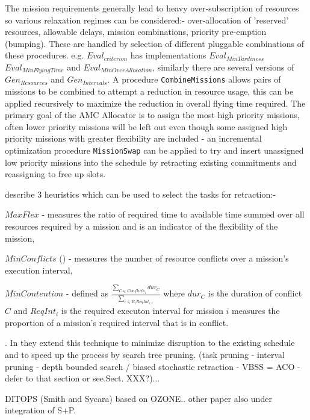 The mission requirements generally lead to heavy over-subscription of resources so various relaxation regimes can be considered:- over-allocation of 'reserved' resources, allowable delays, mission combinations, priority pre-emption (bumping). These are handled by selection of different pluggable combinations of these procedures. e.g. $Eval_{criterion}$ has implementations $Eval_{MinTardiness}$ $Eval_{MinFlyingTime}$ and $Eval_{MinOverAllocation}$, similarly there are several versions of $Gen_{Resources}$ and $Gen_{Intervals}$. A procedure \texttt{CombineMissions} allows pairs of missions to be combined to attempt a reduction in resource usage, this can be applied recursively to maximize the reduction in overall flying time required. The primary goal of the AMC Allocator is to assign the most high priority missions, often lower priority missions will be left out even though some assigned high priority missions with greater flexibility are included - an incremental optimization procedure \texttt{MissionSwap} can be applied to try and insert unassigned low priority missions into the schedule by retracting existing commitments and reassigning to free up slots. 

\cite{kramer03maxflex} describe 3 heuristics which can be used to select the tasks for retraction:- \begin{inparaenum} \item $MaxFlex$ - measures the ratio of required time to available time summed over all resources required by a mission and is an indicator of the flexibility of the mission, \item $MinConflicts$ (\cite{minton92minconflicts}) - measures the number of resource conflicts over a mission's execution interval, \item $MinContention$ - defined as $\frac {\sum_{C \in Conflicts_i} dur_C}{\sum_{r \in R_i ReqInt_{r,i}}}$ where $dur_C$ is the duration of conflict $C$ and $ReqInt_i$ is the required executon interval for mission $i$ measures the proportion of a mission's required interval that is in conflict. \end{inparaenum}. In \cite{kramer04swapping} they extend this technique to minimize disruption to the existing schedule and to speed up the process by search tree pruning. (task pruning - interval pruning - depth bounded search / biased stochastic retraction - VBSS = ACO  - defer to that section or see.Sect. XXX?)...


DITOPS (Smith and Sycara) based on OZONE.. other paper also under integration of S+P.

